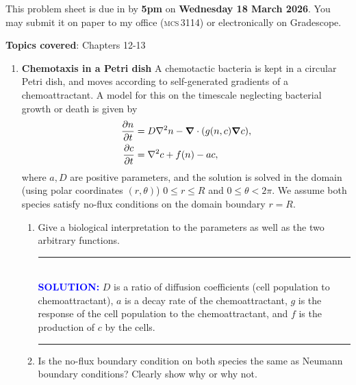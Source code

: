 \documentclass[a4paper,12pt]{article}
\begin{document}
 
\newcommand{\sol}[1]{\\ \hrule\hfill \\ \textcolor{blue}{\textbf{SOLUTION:}} #1 \\ \hrule\hfill}
\renewcommand*{\thefootnote}{\arabic{footnote}}

  This problem sheet is due in by \textbf{5pm} on \textbf{Wednesday 18 March 2026}. You may submit it on paper to my office (\textsc{mcs}\,3114) or electronically on Gradescope.

\textbf{Topics covered}: Chapters 12-13


\begin{enumerate}

\item \textbf{Chemotaxis in a Petri dish} \quad 
A chemotactic bacteria is kept in a circular Petri dish, and moves according to self-generated gradients of a chemoattractant. A model for this on the timescale neglecting bacterial growth or death is given by
\begin{align*}
        \pd{n}{t} &= D\nabla^2 n - \vnabla \cdot (g(n,c)\vnabla c),\\
        \pd{c}{t} &= \nabla^2 c + f(n) - ac,
\end{align*}
where $a,D$ are positive parameters, and the solution is solved in the domain (using polar coordinates $(r,\theta)$) $0 \leq r \leq R$ and $0 \leq \theta < 2\pi$. We assume both species satisfy no-flux conditions on the domain boundary $r = R$.
\begin{enumerate}
    \item Give a biological interpretation to the parameters as well as the two arbitrary functions. 
    \sol{
        $D$ is a ratio of diffusion coefficients (cell population to chemoattractant), $a$ is a decay rate of the chemoattractant, $g$ is the response of the cell population to the chemoattractant, and $f$ is the production of $c$ by the cells. 
}  
    \item Is the no-flux boundary condition on both species the same as Neumann boundary conditions? Clearly show why or why not.

\end{enumerate}
\end{enumerate}
\end{document}
